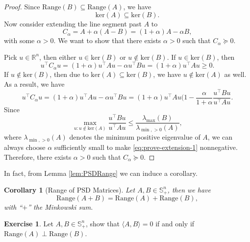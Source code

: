 \documentclass[
]{book}
\newtheorem{corollary}{Corollary}[chapter]
\theoremstyle{definition}
\theoremstyle{definition}
\theoremstyle{definition}
\newtheorem{exercise}{Exercise}[chapter]
\theoremstyle{definition}
\theoremstyle{remark}
\begin{document}
\begin{proof}
Since \(\mathrm{Range}(B) \subseteq \mathrm{Range}(A)\), we have
\[
\mathrm{ker}(A) \subseteq \mathrm{ker}(B).
\]
Now consider extending the line segment past \(A\) to
\[
C_{\alpha} = A + \alpha(A - B) = (1+\alpha) A - \alpha B,
\]
with some \(\alpha > 0\). We want to show that there exists \(\alpha > 0\) such that \(C_{\alpha} \succeq 0\).

Pick \(u \in \mathbb{R}^{n}\), then either \(u \in \mathrm{ker}(B)\) or \(u \not\in \mathrm{ker}(B)\). If \(u \in \mathrm{ker}(B)\), then
\[
u^\top C_{\alpha} u = (1+\alpha) u^\top A u - \alpha u^\top B u = (1+\alpha) u^\top A u \geq 0.
\]
If \(u \not\in \mathrm{ker}(B)\), then due to \(\mathrm{ker}(A) \subseteq \mathrm{ker}(B)\), we have \(u \not\in \mathrm{ker}(A)\) as well. As a result, we have
\begin{equation}
u^\top C_{\alpha} u = (1+\alpha) u^\top A u - \alpha u^\top B u = (1+\alpha) u^\top A u \lparen{ 1- \frac{\alpha}{1+\alpha} \frac{u^\top B u}{u^\top A u} }.
\label{eq:prove-extension-1}
\end{equation}
Since
\[
\max_{u: u \not\in \mathrm{ker}(A)} \frac{u^\top B u}{u^\top A u} \leq \frac{\lambda_{\max}(B)}{\lambda_{\min,>0}(A)},
\]
where \(\lambda_{\min,>0}(A)\) denotes the minimum positive eigenvalue of \(A\), we can always choose \(\alpha\) sufficiently small to make \eqref{eq:prove-extension-1} nonnegative. Therefore, there exists \(\alpha > 0\) such that \(C_{\alpha} \succeq 0\).
\end{proof}

In fact, from Lemma \ref{lem:PSDRange} we can induce a corollary.

\begin{corollary}[Range of PSD Matrices]
\protect\hypertarget{cor:PSDRange}{}\label{cor:PSDRange}Let \(A, B \in \mathbb{S}^{n}_{+}\), then we have
\[
\mathrm{Range}(A + B) = \mathrm{Range}(A) + \mathrm{Range}(B),
\]
with ``\(+\)'' the Minkowski sum.
\end{corollary}

\begin{exercise}
Let \(A,B \in \mathbb{S}^{n}_{+}\), show that \(\langle A, B \rangle = 0\) if and only if \(\mathrm{Range}(A) \perp \mathrm{Range}(B)\).
\end{exercise}
\end{document}
